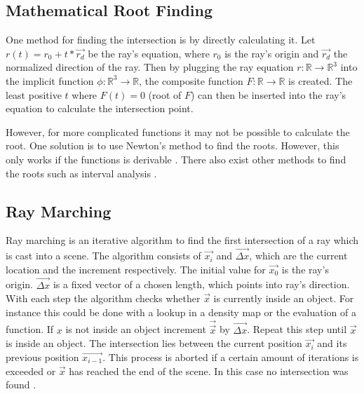 \subsection{Mathematical Root Finding}
One method for finding the intersection is by directly calculating it. Let $r(t) = r_0 + t* \vec{r_d}$ be the ray's equation, where $r_0$ is the ray's origin and $\vec{r_d}$ the normalized direction of the ray. Then by plugging the ray equation $r : \mathds{R} \rightarrow \mathds{R}^{3} $ into the implicit function $\phi : \mathds{R}^{3} \rightarrow \mathds{R} $, the composite function $F : \mathds{R} \rightarrow \mathds{R}$ is created. The least positive $t$ where $F(t) = 0$ (root of $F$) can then be inserted into the ray's equation to calculate the intersection point\cite{hart:1996:sphere}.

However, for more complicated functions it may not be possible to calculate the root. One solution is to use Newton’s method to find the roots. However, this only works if the functions is derivable \cite{hart:1996:sphere}. There also exist other methods to find the roots such as interval analysis \cite{mitchell:1990:robust}.

\subsection{Ray Marching}
Ray marching is an iterative algorithm to find the first intersection of a ray which is cast into a scene. The algorithm consists of $\vec{x_i}$ and $\vec{ \Delta x}$, which are the current location and the increment respectively. The initial value for $\vec{x_0}$ is the ray's origin. $\vec{ \Delta x}$ is a fixed vector of a chosen length, which points into ray's direction. With each step the algorithm checks whether $\vec{x}$ is currently inside an object. For instance this could be done with a lookup in a density map or the evaluation of a function. If $x$ is not inside an object increment $\vec{\vec{x}}$ by $\vec{ \Delta x}$. Repeat this step until $\vec{x}$ is inside an object. The intersection lies between the current position  $\vec{x_i}$ and its previous position  $\vec{x_{i-1}}$. This process is aborted if a certain amount of iterations is exceeded or $\vec{x}$ has reached the end of the scene. In this case no intersection was found \cite{tuy:1984:direct, perlin:1989:hypertexture}.

